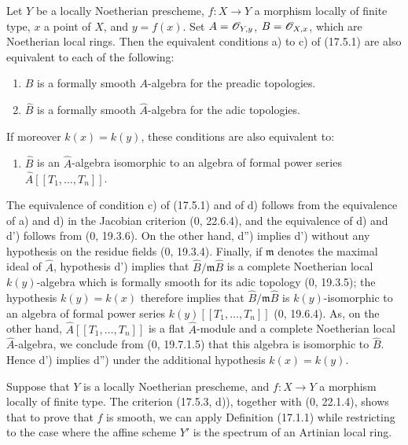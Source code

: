 \begin{proposition}[17.5.3]
\label{IV.17.5.3}
Let $Y$ be a locally Noetherian prescheme, $f:X\to Y$ a morphism locally of finite type, $x$ a point of $X$, and $y=f(x)$. Set $A=\mathscr{O}_{Y,y}$, $B=\mathscr{O}_{X,x}$, which are Noetherian local rings. Then the equivalent conditions a) to c) of (17.5.1) are also equivalent to each of the following:
\begin{enumerate}
  \item[d)] $B$ is a formally smooth $A$-algebra for the preadic topologies.
  \item[d')] $\widehat B$ is a formally smooth $\widehat A$-algebra for the adic topologies.
\end{enumerate}
If moreover $k(x)=k(y)$, these conditions are also equivalent to:
\begin{enumerate}
  \item[d'')] $\widehat B$ is an $\widehat A$-algebra isomorphic to an algebra of formal power series $\widehat A[[T_1,\ldots,T_n]]$.
\end{enumerate}
\end{proposition}

The equivalence of condition c) of (17.5.1) and of d) follows from the equivalence of a) and d) in the Jacobian criterion (0, 22.6.4), and the equivalence of d) and d') follows from (0, 19.3.6). On the other hand, d'') implies d') without any hypothesis on the residue fields (0, 19.3.4). Finally, if $\mathfrak m$ denotes the maximal ideal of $\widehat A$, hypothesis d') implies that $\widehat B/\mathfrak m\widehat B$ is a complete Noetherian local $k(y)$-algebra which is formally smooth for its adic topology (0, 19.3.5); the hypothesis $k(y)=k(x)$ therefore implies that $\widehat B/\mathfrak m\widehat B$ is $k(y)$-isomorphic to an algebra of formal power series $k(y)[[T_1,\ldots,T_n]]$ (0, 19.6.4). As, on the other hand, $\widehat A[[T_1,\ldots,T_n]]$ is a flat $\widehat A$-module and a complete Noetherian local $\widehat A$-algebra, we conclude from (0, 19.7.1.5) that this algebra is isomorphic to $\widehat B$. Hence d') implies d'') under the additional hypothesis $k(x)=k(y)$.

\begin{remark}[17.5.4]
\label{IV.17.5.4}
Suppose that $Y$ is a locally Noetherian prescheme, and $f:X\to Y$ a morphism locally of finite type. The criterion (17.5.3, d)), together with (0, 22.1.4), shows that to prove that $f$ is smooth, we can apply Definition (17.1.1) while restricting to the case where the affine scheme $Y'$ is the spectrum of an Artinian local ring.
\end{remark}

